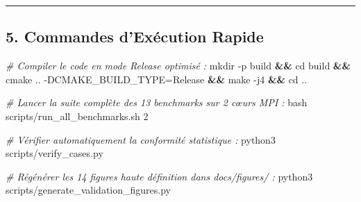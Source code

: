 \documentclass[
  french,
]{article}
\newenvironment{Shaded}{}{}
\newcommand{\AttributeTok}[1]{\textcolor[rgb]{0.49,0.56,0.16}{#1}}
\newcommand{\BuiltInTok}[1]{\textcolor[rgb]{0.00,0.50,0.00}{#1}}
\newcommand{\CommentTok}[1]{\textcolor[rgb]{0.38,0.63,0.69}{\textit{#1}}}
\newcommand{\ExtensionTok}[1]{#1}
\newcommand{\FunctionTok}[1]{\textcolor[rgb]{0.02,0.16,0.49}{#1}}
\newcommand{\KeywordTok}[1]{\textcolor[rgb]{0.00,0.44,0.13}{\textbf{#1}}}
\newcommand{\NormalTok}[1]{#1}
\newcommand{\OperatorTok}[1]{\textcolor[rgb]{0.40,0.40,0.40}{#1}}
\begin{document}
\begin{center}\rule{0.5\linewidth}{0.5pt}\end{center}

\subsection{5. Commandes d'Exécution
Rapide}\label{commandes-dexuxe9cution-rapide}

\begin{Shaded}
\begin{Highlighting}[]
\CommentTok{\# Compiler le code en mode Release optimisé :}
\FunctionTok{mkdir} \AttributeTok{{-}p}\NormalTok{ build }\KeywordTok{\&\&} \BuiltInTok{cd}\NormalTok{ build }\KeywordTok{\&\&} \FunctionTok{cmake}\NormalTok{ .. }\AttributeTok{{-}DCMAKE\_BUILD\_TYPE}\OperatorTok{=}\NormalTok{Release }\KeywordTok{\&\&} \FunctionTok{make} \AttributeTok{{-}j4} \KeywordTok{\&\&} \BuiltInTok{cd}\NormalTok{ ..}

\CommentTok{\# Lancer la suite complète des 13 benchmarks sur 2 cœurs MPI :}
\FunctionTok{bash}\NormalTok{ scripts/run\_all\_benchmarks.sh 2}

\CommentTok{\# Vérifier automatiquement la conformité statistique :}
\ExtensionTok{python3}\NormalTok{ scripts/verify\_cases.py}

\CommentTok{\# Régénérer les 14 figures haute définition dans docs/figures/ :}
\ExtensionTok{python3}\NormalTok{ scripts/generate\_validation\_figures.py}
\end{Highlighting}
\end{Shaded}
\end{document}
